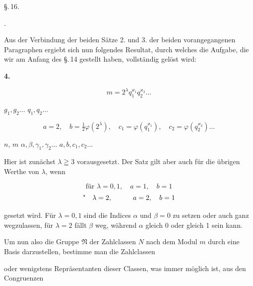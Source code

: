 
\begin{center}
\S.\,16.

.
\end{center}

Aus der Verbindung der beiden Sätze 2. und 3. der beiden vorangegangenen Paragraphen ergiebt sich nun folgendes Resultat, durch welches die Aufgabe, die wir am Anfang des \S.\,14 gestellt haben, vollständig gelöst wird:

\noindent\textbf{4.} 

\[
m = 2^\lambda q_1^{\varkappa_1} q_2^{\varkappa_2} \ldots
\]

 $g_1, g_2 \ldots$  $q_1, q_2 \ldots$ 

\[
a = 2, \quad b = \tfrac12 \varphi(2^\lambda), \quad c_1 = \varphi(q_1^{\varkappa_1}), \quad c_2 = \varphi(q_2^{\varkappa_2}) \ldots
\]

 $n$,  $m$  $\alpha, \beta, \gamma_1, \gamma_2 \ldots$  $a, b, c_1, c_2 \ldots$ 




Hier ist zunächst $\lambda \geqq 3$ vorausgesetzt. Der Satz gilt aber auch für die übrigen Werthe von $\lambda$, wenn

\[
\text{für } \lambda = 0, 1, \quad a = 1, \quad b = 1
\]
\[
\text{\textquotedbl{}} \quad \lambda = 2, \qquad\quad a = 2, \quad b = 1
\]

gesetzt wird. Für $\lambda = 0, 1$ sind die Indices $\alpha$ und $\beta = 0$ zu setzen oder auch ganz wegzulassen, für $\lambda = 2$ fällt $\beta$ weg, während $\alpha$ gleich 0 oder gleich 1 sein kann.

Um nun also die Gruppe $\mathfrak{N}$ der Zahlclassen $N$ nach dem Modul $m$ durch eine Basis darzustellen, bestimme man die Zahlclassen


oder wenigstens Repräsentanten dieser Classen, was immer möglich ist, aus den Congruenzen
